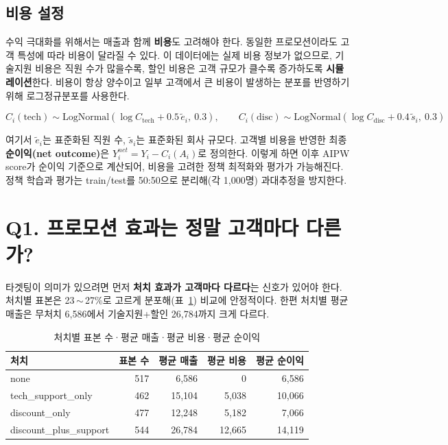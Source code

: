 \documentclass[11pt]{article}
\begin{document}
\subsection{비용 설정}

수익 극대화를 위해서는 매출과 함께 \textbf{비용}도 고려해야 한다. 동일한 프로모션이라도 고객 특성에 따라 비용이 달라질 수 있다. 이 데이터에는 실제 비용 정보가 없으므로, 기술지원 비용은 직원 수가 많을수록, 할인 비용은 고객 규모가 클수록 증가하도록 \textbf{시뮬레이션}한다. 비용이 항상 양수이고 일부 고객에서 큰 비용이 발생하는 분포를 반영하기 위해 로그정규분포를 사용한다.

\[
C_i(\text{tech}) \sim \text{LogNormal}(\log C_{\text{tech}} + 0.5\,\tilde{e}_i,\ 0.3), \qquad
C_i(\text{disc}) \sim \text{LogNormal}(\log C_{\text{disc}} + 0.4\,\tilde{s}_i,\ 0.3)
\]

여기서 $\tilde{e}_i$는 표준화된 직원 수, $\tilde{s}_i$는 표준화된 회사 규모다. 고객별 비용을 반영한 최종 \textbf{순이익(net outcome)}은 $Y_i^{net} = Y_i - C_i(A_i)$로 정의한다. 이렇게 하면 이후 AIPW score가 순이익 기준으로 계산되어, 비용을 고려한 정책 최적화와 평가가 가능해진다. 정책 학습과 평가는 train/test를 50:50으로 분리해(각 1{,}000명) 과대추정을 방지한다.

\section{Q1. 프로모션 효과는 정말 고객마다 다른가?}

타겟팅이 의미가 있으려면 먼저 \textbf{처치 효과가 고객마다 다르다}는 신호가 있어야 한다. 처치별 표본은 23\,$\sim$\,27\%로 고르게 분포해(표~\ref{tab:summary}) 비교에 안정적이다. 한편 처치별 평균 매출은 무처치 6{,}586에서 기술지원+할인 26{,}784까지 크게 다르다.

\begin{table}[h]
\centering
\small
\caption{처치별 표본 수·평균 매출·평균 비용·평균 순이익}
\label{tab:summary}
\begin{tabular}{lrrrr}
\toprule
처치 & 표본 수 & 평균 매출 & 평균 비용 & 평균 순이익 \\
\midrule
none & 517 & 6{,}586 & 0 & 6{,}586 \\
tech\_support\_only & 462 & 15{,}104 & 5{,}038 & 10{,}066 \\
discount\_only & 477 & 12{,}248 & 5{,}182 & 7{,}066 \\
discount\_plus\_support & 544 & 26{,}784 & 12{,}665 & 14{,}119 \\
\bottomrule
\end{tabular}
\end{table}
\end{document}
